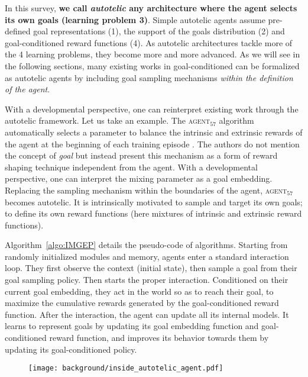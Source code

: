 In this survey, \textbf{we call \textit{autotelic} any architecture where the agent selects its own goals (learning problem 3)}. Simple autotelic agents assume pre-defined goal representations (1), the support of the goals distribution (2) and goal-conditioned reward functions (4). As autotelic architectures tackle more of the 4 learning problems, they become more and more advanced. As we will see in the following sections, many existing works in goal-conditioned \rl can be formalized as autotelic agents by including goal sampling mechanisms \textit{within the definition of the agent}. 

With a developmental perspective, one can reinterpret existing work through the autotelic \rl framework. Let us take an example. The \textsc{agent$_{57}$} algorithm automatically selects a parameter to balance the intrinsic and extrinsic rewards of the agent at the beginning of each training episode \citep{badia2020agent57}. The authors do not mention the concept of \textit{goal} but instead present this mechanism as a form of reward shaping technique independent from the agent. With a developmental perspective, one can interpret the mixing parameter as a goal embedding. Replacing the sampling mechanism within the boundaries of the agent, \textsc{agent$_{57}$} becomes autotelic. It is intrinsically motivated to sample and target its own goals; \ie to define its own reward functions (here mixtures of intrinsic and extrinsic reward functions). 

Algorithm~\ref{algo:IMGEP} details the pseudo-code of \rlimgep algorithms. Starting from randomly initialized modules and memory, \rlimgep agents enter a standard \rl interaction loop. They first observe the context (initial state), then sample a goal from their goal sampling policy. Then starts the proper interaction. Conditioned on their current goal embedding, they act in the world so as to reach their goal, \ie to maximize the cumulative rewards generated by the goal-conditioned reward function. After the interaction, the agent can update all its internal models. It learns to represent goals by updating its goal embedding function and goal-conditioned reward function, and improves its behavior towards them by updating its goal-conditioned policy. 

\begin{figure}[!h]
\centering
\texttt{[image: background/inside\_autotelic\_agent.pdf]}
\caption{}
\end{figure}



